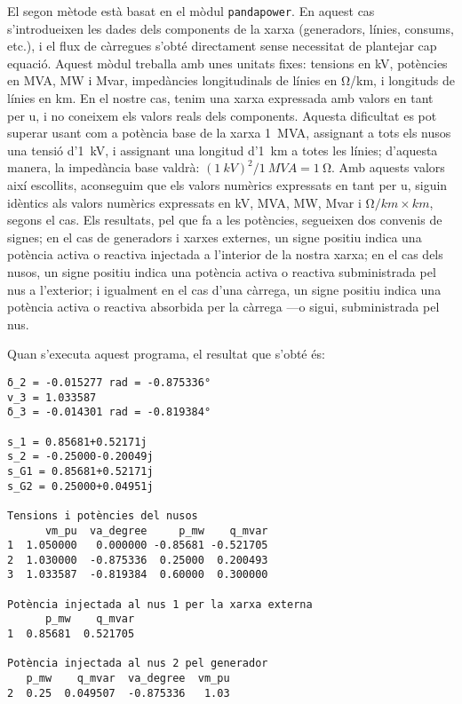 El segon mètode està basat en el mòdul \texttt{pandapower}. En aquest cas s'introdueixen les dades dels components de la xarxa (generadors, línies, consums, etc.), i el flux de càrregues s'obté directament sense necessitat de plantejar cap equació. Aquest mòdul treballa amb unes unitats fixes: tensions en  \unit{kV}, potències en  \unit{MVA}, \unit{MW} i \unit{Mvar}, impedàncies longitudinals de línies en \unit{\ohm/km}, i longituds de línies en  \unit{km}. En el nostre cas, tenim una xarxa expressada amb valors en tant per u, i no coneixem els valors reals dels components. Aquesta dificultat es pot superar usant com a potència base de la xarxa \qty{1}{MVA}, assignant a tots els nusos una tensió d'\qty{1}{kV}, i assignant una longitud d'\qty{1}{km} a totes les línies; d'aquesta manera, la impedància base valdrà: $(\qty{1}{kV})^2/\qty{1}{MVA} = \qty{1}{\ohm}$. Amb aquests valors així escollits, aconseguim que els valors numèrics expressats en tant per u, siguin idèntics als valors numèrics expressats en 
\unit{kV},  \unit{MVA}, \unit{MW}, \unit{Mvar} i $\unit{\ohm/km}\times\unit{km}$, segons el cas. Els resultats, pel que fa a les potències,  segueixen dos convenis de signes; en el cas de generadors i xarxes externes, un signe positiu indica una potència activa o reactiva injectada a l'interior de la nostra xarxa; en el cas dels nusos, un signe positiu indica una potència activa o reactiva subministrada pel nus a l'exterior; i igualment en el cas d'una càrrega, un signe positiu indica una potència activa o reactiva absorbida per la càrrega ---o sigui, subministrada  pel nus.


Quan s'executa aquest programa, el resultat que s'obté és:
\lstset{
	language=,
	numbers=none,
	frame=none
}
\begin{lstlisting}
δ_2 = -0.015277 rad = -0.875336°
v_3 = 1.033587
δ_3 = -0.014301 rad = -0.819384°

s_1 = 0.85681+0.52171j
s_2 = -0.25000-0.20049j
s_G1 = 0.85681+0.52171j
s_G2 = 0.25000+0.04951j

Tensions i potències del nusos
      vm_pu  va_degree     p_mw    q_mvar
1  1.050000   0.000000 -0.85681 -0.521705
2  1.030000  -0.875336  0.25000  0.200493
3  1.033587  -0.819384  0.60000  0.300000

Potència injectada al nus 1 per la xarxa externa
      p_mw    q_mvar
1  0.85681  0.521705

Potència injectada al nus 2 pel generador
   p_mw    q_mvar  va_degree  vm_pu
2  0.25  0.049507  -0.875336   1.03
\end{lstlisting} 


